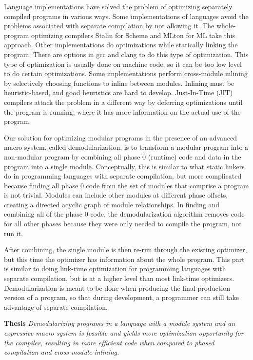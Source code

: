 Language implementations have solved the problem of optimizing separately compiled programs in various ways.
Some implementations of languages avoid the problems associated with separate compilation by not allowing it. 
The whole-program optimizing compilers Stalin \cite{stalin} for Scheme and MLton \cite{mlton} for ML take this approach.
Other implementations do optimizations while statically linking the program.
There are options in gcc \cite{gcc} and clang \cite{clang} to do this type of optimization.
This type of optimization is usually done on machine code, so it can be too low level to do certain optimizations.
Some implementations perform cross-module inlining by selectively choosing functions to inline between modules.
Inlining must be heuristic-based, and good heuristics are hard to develop. 
Just-In-Time (JIT) compilers attack the problem in a different way by deferring optimizations until the program is running, where it has more information on the actual use of the program.

Our solution for optimizing modular programs in the presence of an advanced macro system, called demodularization, is to transform a modular program into a non-modular program by combining all phase 0 (runtime) code and data in the program into a single module.
Conceptually, this is similar to what static linkers do in programming languages with separate compilation, but more complicated because finding all phase 0 code from the set of modules that comprise a program is not trivial.
Modules can include other modules at different phase offsets, creating a directed acyclic graph of module relationships.
In finding and combining all of the phase 0 code, the demodularization algorithm removes code for all other phases because they were only needed to compile the program, not run it.

After combining, the single module is then re-run through the existing optimizer, but this time the optimizer has information about the whole program.
This part is similar to doing link-time optimization for programming languages with separate compilation, but is at a higher level than most link-time optimizers.
Demodularization is meant to be done when producing the final production version of a program, so that during development, a programmer can still take advantage of separate compilation.

\vspace{1em}
\noindent
\textbf{Thesis} \textit{Demodularizing programs in a language with a module system and an expressive macro system is feasible and yields more optimization opportunity for the compiler, resulting in more efficient code when compared to phased compilation and cross-module inlining.}
\vspace{1em}

